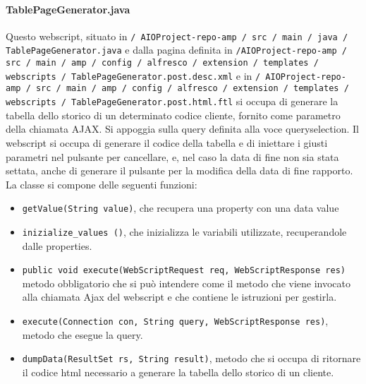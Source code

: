 \paragraph{TablePageGenerator.java}
Questo webscript, situato in \texttt{/ AIOProject-repo-amp / src / main / java / TablePageGenerator.java} e dalla pagina definita in \texttt{/AIOProject-repo-amp / src / main / amp / config / alfresco / extension / templates / webscripts / TablePageGenerator.post.desc.xml} e in \texttt{/ AIOProject-repo-amp / src / main / amp / config / alfresco / extension / templates / webscripts / TablePageGenerator.post.html.ftl}  si occupa di generare la tabella dello storico di un determinato codice cliente, fornito come parametro della chiamata AJAX. Si appoggia sulla query definita alla voce queryselection.
Il webscript si occupa di generare il codice della tabella e di iniettare i giusti parametri nel pulsante per cancellare, e, nel caso la data di fine non sia stata settata, anche di generare il pulsante per la modifica della data di fine rapporto.
La classe si compone delle seguenti funzioni:
\begin{itemize}
\item \texttt{getValue(String value)}, che recupera una property con una data value
\item \texttt{inizialize\_values ()}, che inizializza le variabili utilizzate, recuperandole dalle properties.
\item \texttt{public void execute(WebScriptRequest req, WebScriptResponse res)} metodo obbligatorio che si può intendere come il metodo che viene invocato alla chiamata Ajax del webscript e che contiene le istruzioni per gestirla.
\item \texttt{execute(Connection con, String query, WebScriptResponse res)}, metodo che esegue la query.
\item \texttt{dumpData(ResultSet rs, String result)}, metodo che si occupa di ritornare il codice html necessario a generare la tabella dello storico di un cliente.
\end{itemize}
